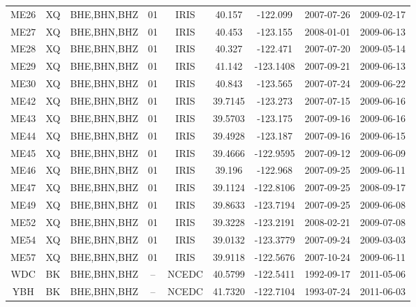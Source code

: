 \documentclass{article}
\begin{document}
\begin{table}
\begin{tabular}{c c c c c c c c c}
ME26 & XQ & BHE,BHN,BHZ & 01 & IRIS & 40.157 & -122.099 & 2007-07-26 & 2009-02-17 \\
ME27 & XQ & BHE,BHN,BHZ & 01 & IRIS & 40.453 & -123.155 & 2008-01-01 & 2009-06-13 \\
ME28 & XQ & BHE,BHN,BHZ & 01 & IRIS & 40.327 & -122.471 & 2007-07-20 & 2009-05-14 \\
ME29 & XQ & BHE,BHN,BHZ & 01 & IRIS & 41.142 & -123.1408 & 2007-09-21 & 2009-06-13 \\
ME30 & XQ & BHE,BHN,BHZ & 01 & IRIS & 40.843 & -123.565 & 2007-07-24 & 2009-06-22 \\
ME42 & XQ & BHE,BHN,BHZ & 01 & IRIS & 39.7145 & -123.273 & 2007-07-15 & 2009-06-16 \\
ME43 & XQ & BHE,BHN,BHZ & 01 & IRIS & 39.5703 & -123.175 & 2007-09-16 & 2009-06-16 \\
ME44 & XQ & BHE,BHN,BHZ & 01 & IRIS & 39.4928 & -123.187 & 2007-09-16 & 2009-06-15 \\
ME45 & XQ & BHE,BHN,BHZ & 01 & IRIS & 39.4666 & -122.9595 & 2007-09-12 & 2009-06-09 \\
ME46 & XQ & BHE,BHN,BHZ & 01 & IRIS & 39.196 & -122.968 & 2007-09-25 & 2009-06-11 \\
ME47 & XQ & BHE,BHN,BHZ & 01 & IRIS & 39.1124 & -122.8106 & 2007-09-25 & 2008-09-17 \\
ME49 & XQ & BHE,BHN,BHZ & 01 & IRIS & 39.8633 & -123.7194 & 2007-09-25 & 2009-06-08 \\
ME52 & XQ & BHE,BHN,BHZ & 01 & IRIS & 39.3228 & -123.2191 & 2008-02-21 & 2009-07-08 \\
ME54 & XQ & BHE,BHN,BHZ & 01 & IRIS & 39.0132 & -123.3779 & 2007-09-24 & 2009-03-03 \\
ME57 & XQ & BHE,BHN,BHZ & 01 & IRIS & 39.9118 & -122.5676 & 2007-10-24 & 2009-06-11 \\
WDC & BK & BHE,BHN,BHZ & -- & NCEDC & 40.5799 & -122.5411 &1992-09-17 & 2011-05-06 \\
YBH &  BK & BHE,BHN,BHZ & -- & NCEDC & 41.7320 & -122.7104 & 1993-07-24 & 2011-06-03 \\
\hline
\end{tabular}
\end{table}
\end{document}
